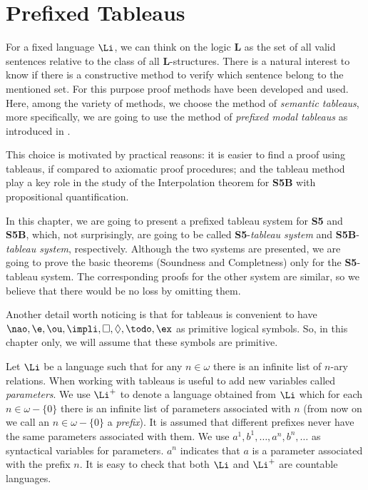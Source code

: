 \section{Prefixed Tableaus}

\qquad For a fixed language $\Li$, we can think on the logic \textbf{L} as the set of all valid sentences relative to the class of all \textbf{L}-structures. There is a natural interest to know if there is a constructive method to verify which sentence belong to the mentioned set. For this purpose proof methods have been developed and used. Here, among the variety of methods, we choose the method of \textit{semantic tableaus}, more specifically, we are going to use the method of \textit{prefixed modal tableaus} as introduced in \cite{Fitting83}.

\qquad This choice is motivated by practical reasons: it is easier to find a proof using tableaus, if compared to axiomatic proof procedures; and the tableau method play a key role in the study of the Interpolation theorem for \textbf{S5B} with propositional quantification.   

\qquad In this chapter, we are going to present a prefixed tableau system for \textbf{S5} and \textbf{S5B}, which, not surprisingly, are going to be called \textbf{S5}-\textit{tableau system} and \textbf{S5B}-\textit{tableau system}, respectively. Although the two systems are presented, we are going to prove the basic theorems (Soundness and Completness) only for the \textbf{S5}-tableau system. The corresponding proofs for the other system are similar, so we believe that there would be no loss by omitting them.

\qquad Another detail worth noticing is that for tableaus is convenient to have $\nao, \e, \ou, \impli, \Box, \Diamond, \todo, \ex$ as primitive logical symbols. So, in this chapter only, we will assume that these symbols are primitive.

\qquad Let $\Li$ be a language such that for any $n \in \omega$ there is an infinite list of $n$-ary relations. When working with tableaus is useful to add new variables called \textit{parameters}. We use $\Li^{+}$ to denote a language obtained from $\Li$ which for each $n \in \omega - \{0\}$ there is an infinite list of parameters associated with $n$ (from now on we call an $n \in \omega - \{0\}$ a \textit{prefix}). It is assumed that different prefixes never have the same parameters associated with them. We use $a^{1}, b^{1}, \dots, a^{n}, b^{n}, \dots$ as syntactical variables for parameters. $a^{n}$ indicates that $a$ is a parameter associated with the prefix $n$. It is easy to check that both $\Li$ and $\Li^{+}$ are countable languages.

